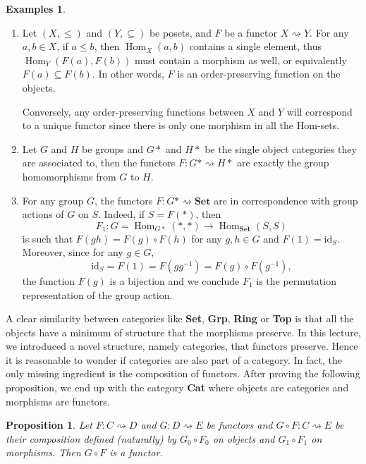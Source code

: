 \documentclass{article}
\newtheorem{prop}[thm]{Proposition}
\theoremstyle{definition}
\newtheorem{exmps}[thm]{Examples}
\theoremstyle{remark}
\DeclareMathOperator{\Hom}{Hom}
\newcommand{\id}{\text{id}}
\begin{document}
\begin{exmps}
\begin{enumerate}
		\item Let $(X, \leq)$ and $(Y, \subseteq)$ be posets, and $F$ be a functor $X \rightsquigarrow Y$. For any $a, b \in X$, if $a\leq b$, then $\Hom_X(a,b)$ contains a single element, thus $\Hom_Y(F(a), F(b))$ must contain a morphism as well, or equivalently $F(a) \subseteq F(b)$. In other words, $F$ is an order-preserving function on the objects.
		
		Conversely, any order-preserving functions between $X$ and $Y$ will correspond to a unique functor since there is only one morphism in all the Hom-sets.
				
		\item Let $G$ and $H$ be groups and $G\ast$ and $H\ast$ be the single object categories they are associated to, then the functors $F: G\ast \rightsquigarrow H\ast$ are exactly the group homomorphisms from $G$ to $H$.
		
		\item For any group $G$, the functors $F:G\ast \rightsquigarrow \textbf{Set}$ are in correspondence with group actions of $G$ on $S$. Indeed, if $S = F(\ast)$, then \[F_1: G = \Hom_{G\ast}(\ast, \ast) \rightarrow \Hom_{\textbf{Set}}(S, S)\]
		is such that $F(gh) = F(g) \circ F(h)$ for any $g,h \in G$ and $F(1) = \id_S$. Moreover, since for any $g \in G$,
		\[\id_S = F(1) = F(gg^{-1}) = F(g) \circ F(g^{-1}),\]
		the function $F(g)$ is a bijection and we conclude $F_1$ is the permutation representation of the group action.
	\end{enumerate}
\end{exmps}
A clear similarity between categories like \textbf{Set}, \textbf{Grp}, \textbf{Ring} or \textbf{Top} is that all the objects have a minimum of structure that the morphisms preserve. In this lecture, we introduced a novel structure, namely categories, that functors preserve. Hence it is reasonable to wonder if categories are also part of a category. In fact, the only missing ingredient is the composition of functors. After proving the following proposition, we end up with the category \textbf{Cat} where objects are categories and morphisms are functors.
\begin{prop}
	Let $F:C\rightsquigarrow D$ and $G: D\rightsquigarrow E$ be functors and $G \circ F:C \rightsquigarrow E$ be their composition defined (naturally) by $G_0 \circ F_0$ on objects and $G_1 \circ F_1$ on morphisms. Then $G \circ F$ is a functor.
\end{prop}
\end{document}
